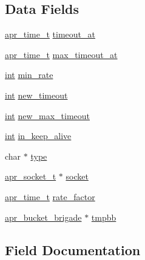 \subsection*{Data Fields}
\begin{DoxyCompactItemize}
\item 
\hyperlink{group__apr__time_gadb4bde16055748190eae190c55aa02bb}{apr\+\_\+time\+\_\+t} \hyperlink{structreqtimeout__con__cfg_a4d8befeff007614479064113475b2974}{timeout\+\_\+at}
\item 
\hyperlink{group__apr__time_gadb4bde16055748190eae190c55aa02bb}{apr\+\_\+time\+\_\+t} \hyperlink{structreqtimeout__con__cfg_ae981dcf89c87ef223f78ccae502d770d}{max\+\_\+timeout\+\_\+at}
\item 
\hyperlink{pcre_8txt_a42dfa4ff673c82d8efe7144098fbc198}{int} \hyperlink{structreqtimeout__con__cfg_ac42af94175ea3fc3fc585cf5724bb96f}{min\+\_\+rate}
\item 
\hyperlink{pcre_8txt_a42dfa4ff673c82d8efe7144098fbc198}{int} \hyperlink{structreqtimeout__con__cfg_ac95f0467b054577467da38ce513fff46}{new\+\_\+timeout}
\item 
\hyperlink{pcre_8txt_a42dfa4ff673c82d8efe7144098fbc198}{int} \hyperlink{structreqtimeout__con__cfg_ae58cf3f15cba76feda0021b87098c72d}{new\+\_\+max\+\_\+timeout}
\item 
\hyperlink{pcre_8txt_a42dfa4ff673c82d8efe7144098fbc198}{int} \hyperlink{structreqtimeout__con__cfg_a93aed67cc5631650f0e536e611d2f7e3}{in\+\_\+keep\+\_\+alive}
\item 
char $\ast$ \hyperlink{structreqtimeout__con__cfg_a50cb12172d0b5ec5788456e88dec8f94}{type}
\item 
\hyperlink{structapr__socket__t}{apr\+\_\+socket\+\_\+t} $\ast$ \hyperlink{structreqtimeout__con__cfg_a9eb9cf2513585581a3867a3b2d7ffd97}{socket}
\item 
\hyperlink{group__apr__time_gadb4bde16055748190eae190c55aa02bb}{apr\+\_\+time\+\_\+t} \hyperlink{structreqtimeout__con__cfg_aca0c60491ddd9b0b22bd4811afe2bec3}{rate\+\_\+factor}
\item 
\hyperlink{structapr__bucket__brigade}{apr\+\_\+bucket\+\_\+brigade} $\ast$ \hyperlink{structreqtimeout__con__cfg_aa59322be932addcb0bb97d1277c989cb}{tmpbb}
\end{DoxyCompactItemize}


\subsection{Field Documentation}
